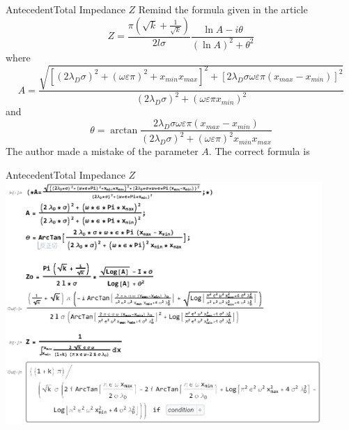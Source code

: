 \documentclass[11pt]{beamer}
\begin{document}
\begin{frame}[fragile]{Antecedent}{Total Impedance $Z$}
    Remind the formula given in the article
    \[Z=\frac{\pi\left(\sqrt{k}+\frac{1}{\sqrt{k}}\right)}{2l\sigma}\frac{\ln{A}-i\theta}{(\ln{A})^2+\theta^2}\]
    where
    \[A=\frac{\sqrt{\left[\left(2\lambda_D\sigma\right)^2+(\omega\varepsilon\pi)^2+x_{min}x_{max}\right]^2+\left[2\lambda_D\sigma\omega\varepsilon\pi\left(x_{max}-x_{min}\right)\right]^2}}{\left(2\lambda_D\sigma\right)^2+(\omega\varepsilon\pi x_{min})^2}\]
    and\\
    \[\theta=\arctan{\frac{2\lambda_D\sigma\omega\varepsilon\pi\left(x_{max}-x_{min}\right)}{\left(2\lambda_D\sigma\right)^2+(\omega\varepsilon\pi)^2x_{min}x_{max}}}\]
    The author made a mistake of the parameter $A$. The correct formula is
\end{frame}
\begin{frame}{Antecedent}{Total Impedance $Z$}
    \includegraphics[width=0.9\textwidth]{1.eps}
\end{frame}
\end{document}
